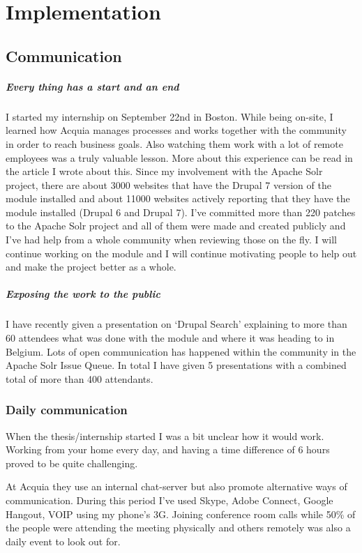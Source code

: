 \chapter{Implementation}
\section{Communication}
\paragraph{Every thing has a start and an end} I started my internship on September 22nd in Boston. While being on-site, I learned how Acquia manages processes and works together with the community in order to reach business goals. Also watching them work with a lot of remote employees was a truly valuable lesson. More about this experience can be read in the article I wrote about this. Since my involvement with the Apache Solr project, there are about 3000 websites that have the Drupal 7 version of the module installed and about 11000 websites actively reporting that they have the module installed (Drupal 6 and Drupal 7). I've committed more than 220 patches to the Apache Solr project and all of them were made and created publicly and I've had help from a whole community when reviewing those on the fly. I will continue working on the module and I will continue motivating people to help out and make the project better as a whole. 

\paragraph{Exposing the work to the public} I have recently given a presentation on ‘Drupal Search’ explaining to more than 60 attendees what was done with the module and where it was heading to in Belgium. Lots of open communication has happened within the community in the Apache Solr Issue Queue. In total I have given 5 presentations with a combined total of more than 400 attendants. 

\subsection{Daily communication}
When the thesis/internship started I was a bit unclear how it would work. Working from your home every day, and having a time difference of 6 hours proved to be quite challenging. 

At Acquia they use an internal chat-server but also promote alternative ways of communication. During this period I've used Skype, Adobe Connect, Google Hangout, VOIP using my phone's 3G. Joining conference room calls while 50\% of the people were attending the meeting physically and others remotely was also a daily event to look out for.


